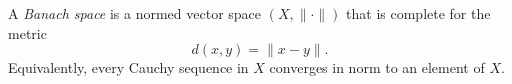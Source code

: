 
A \emph{Banach space} is a normed vector space $(X,\|\cdot\|)$ that is complete for the metric
\[
d(x,y)=\|x-y\|.
\]
Equivalently, every Cauchy sequence in $X$ converges in norm to an element of $X$.
